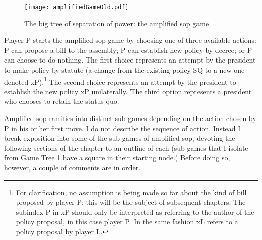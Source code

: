\begin{figure}
 \begin{center}
  \texttt{[image: amplifiedGameOld.pdf]}
 \caption{The big tree of separation of power: the amplified sop game}\label{f:amplifiedGame}
 \end{center}
\end{figure}

Player P starts the amplified sop game by choosing one of three available actions: P can propose a bill to the assembly; P can establish new policy by decree; or P can choose to do nothing.  The first choice represents an attempt by the president to make policy by statute (a change from the existing policy SQ to a new one denoted xP).\footnote{For clarification, no assumption is being made so far about the kind of bill proposed by player P; this will be the subject of subsequent chapters.  The subindex P in xP should only be interpreted as referring to the author of the policy proposal, in this case player P.  In the same fashion xL refers to a policy proposal by player L.}  The second choice represents an attempt by the president to establish the new policy xP unilaterally.  The third option represents a president who chooses to retain the status quo.  

Amplified sop ramifies into distinct sub-games depending on the action chosen by P in his or her first move.  I do not describe the sequence of action.  Instead I break exposition into some of the sub-games of amplified sop, devoting the following sections of the chapter to an outline of each (sub-games that I isolate from Game Tree \ref{f:amplifiedGame} have a square in their starting node.)  Before doing so, however, a couple of comments are in order.  

